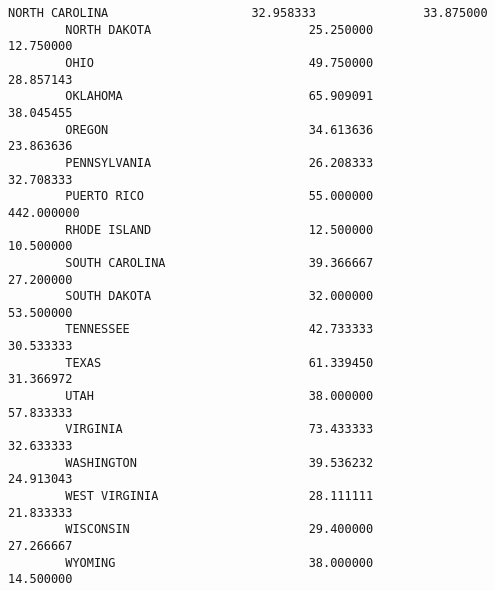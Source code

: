 \documentclass[11pt]{article}
\begin{document}
\begin{Verbatim}[commandchars=\\\{\}]
        NORTH CAROLINA                    32.958333               33.875000   
        NORTH DAKOTA                      25.250000               12.750000   
        OHIO                              49.750000               28.857143   
        OKLAHOMA                          65.909091               38.045455   
        OREGON                            34.613636               23.863636   
        PENNSYLVANIA                      26.208333               32.708333   
        PUERTO RICO                       55.000000              442.000000   
        RHODE ISLAND                      12.500000               10.500000   
        SOUTH CAROLINA                    39.366667               27.200000   
        SOUTH DAKOTA                      32.000000               53.500000   
        TENNESSEE                         42.733333               30.533333   
        TEXAS                             61.339450               31.366972   
        UTAH                              38.000000               57.833333   
        VIRGINIA                          73.433333               32.633333   
        WASHINGTON                        39.536232               24.913043   
        WEST VIRGINIA                     28.111111               21.833333   
        WISCONSIN                         29.400000               27.266667   
        WYOMING                           38.000000               14.500000   
        

\end{Verbatim}
\end{document}
